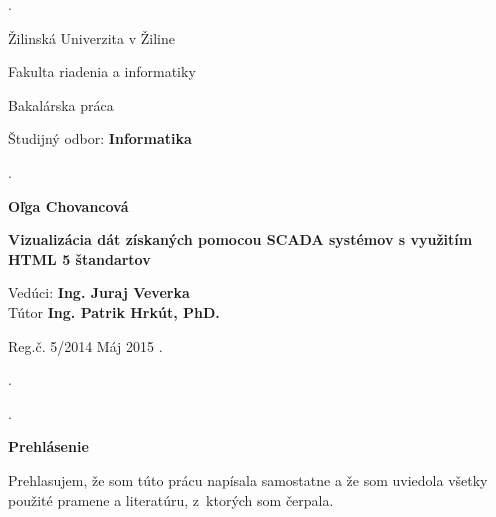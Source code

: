 \hypersetup{pageanchor=false} 

\begin{titlepage}
\phantom.

\bigskip

\begin{center}
{\sc\LARGE Žilinská Univerzita v Žiline}
\medskip

{\sc\Large Fakulta riadenia a informatiky}

\vfill\vfill\vfill\vfill

{\sc\LARGE Bakalárska práca}

\medskip

{\large Študijný odbor: {\bf Informatika}}
\end{center}


\vfill\vfill\vfill\vfill


\phantom.\hfill

\begin{center}
{\large\bf Oľga Chovancová}

\medskip

{\large\bf Vizualizácia dát získaných pomocou SCADA systémov s využitím HTML 5 štandartov}

\medskip

Vedúci: {\bf Ing. Juraj Veverka}\\
Tútor	\textbf{Ing. Patrik Hrkút, PhD.}
\medskip
 
\hfill
Reg.č. 5/2014
\hfill
Máj 2015
\hfill\phantom.
\end{center}

\hspace{1.7cm}\phantom.

\vspace{2.9cm}

\phantom.
\end{titlepage}

\newpage

\centerline{\bf Prehlásenie}

\vspace{2em}

\noindent
Prehlasujem, že som túto prácu napísala samostatne a že som uviedola
všetky použité pramene a literatúru, z~ktorých som čerpala. 


